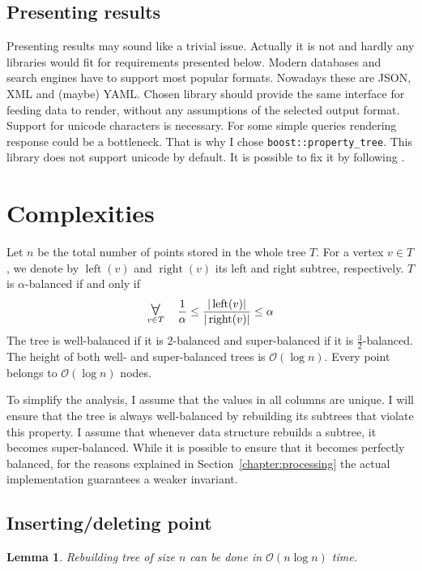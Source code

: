 \documentclass[10pt,a4paper]{article}
\newtheorem{lemma}{Lemma}
\DeclareMathOperator{\rightSon}{right}
\DeclareMathOperator{\leftSon}{left}
\newcommand{\Oh}{\mathcal{O}}
\newcommand\bigforall{\mbox{\Large $\mathsurround0pt\forall$}}
\begin{document}
\subsection{Presenting results}

Presenting results may sound like a trivial issue. Actually it is not and hardly any libraries would fit for requirements presented below. Modern databases and search engines have to support most popular formats. Nowadays these are JSON, XML and (maybe) YAML. Chosen library should provide the same interface for feeding data to render, without any assumptions of the selected output format. Support for unicode characters is necessary. For some simple queries rendering response could be a bottleneck. That is why I chose \verb|boost::property_tree|. This library does not support unicode by default. It is possible to fix it by following \cite{SOANS} .

\section{Complexities}
\label{chapter:complexity}

Let $n$ be the total number of points stored in the whole tree $T$. For a vertex $v\in T$, we denote by $\leftSon(v)$ and $\rightSon(v)$ its left and right subtree, respectively. $T$ is $\alpha$-balanced if and only if 
$$\displaystyle\mathop{\bigforall}_{v\in T} \quad \frac{1}{\alpha} \leq \frac{|\leftSon(v)|}{|\rightSon(v)|} \leq \alpha$$
The tree is well-balanced if it is 2-balanced and super-balanced if it is  $\frac{3}{2}$-balanced. The height of both well- and super-balanced trees is $\Oh(\log n)$. Every point belongs to $\Oh(\log n)$ nodes. 

To simplify the analysis, I assume that the values in all columns are unique. I will ensure that the tree is always well-balanced by rebuilding its subtrees that violate this property. I assume that whenever data structure rebuilds a subtree, it becomes super-balanced. While it is possible to ensure that it becomes perfectly balanced, for the reasons explained in Section~\ref{chapter:processing} the actual implementation guarantees a weaker invariant.

\subsection{Inserting/deleting point}

\begin{lemma}\label{lem:1}
Rebuilding tree of size $n$ can be done in $\Oh(n \log n)$ time.
\end{lemma}
\end{document}
